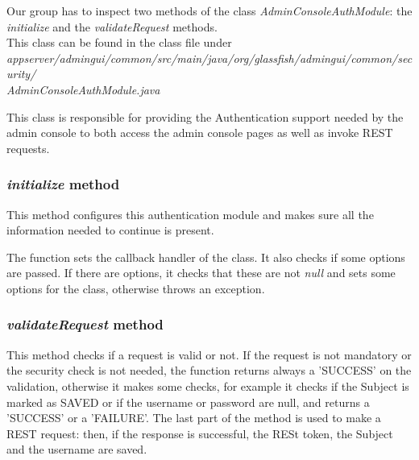 Our group has to inspect two methods of the class \textit{AdminConsoleAuthModule}: the \textit{initialize} and the \textit{validateRequest} methods.\\
This class can be found in the class file under \textit{appserver/admingui/common/src/main/java/org/glassfish/admingui/common/security/\\AdminConsoleAuthModule.java}

This class is responsible for providing the Authentication support needed by the admin console to both access the admin console pages as well as invoke REST requests.

\subsubsection{\textit{initialize} method}
This method configures this authentication module and makes sure all the information needed to continue is present.

The function sets the callback handler of the class.
It also checks if some options are passed. If there are options, it checks that these are not \textit{null} and sets some options for the class, otherwise throws an exception.

\subsubsection{\textit{validateRequest} method}
This method checks if a request is valid or not. If the request is not mandatory or the security check is not needed, the function returns always a 'SUCCESS' on  the validation, otherwise it makes some checks, for example it checks if the Subject is marked as SAVED or if the username or password are null, and returns a 'SUCCESS' or a 'FAILURE'. The last part of the method is used to make a REST request: then, if the response is successful, the RESt token, the Subject and the username are saved.